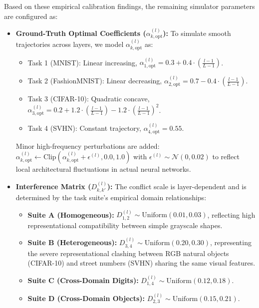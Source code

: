 Based on these empirical calibration findings, the remaining simulator parameters are configured as:
\begin{itemize}
    \item \textbf{Ground-Truth Optimal Coefficients ($\alpha_{k, \text{opt}}^{(l)}$):} To simulate smooth trajectories across layers, we model $\alpha_{k, \text{opt}}^{(l)}$ as:
    \begin{itemize}
        \item Task 1 (MNIST): Linear increasing, $\alpha_{1, \text{opt}}^{(l)} = 0.3 + 0.4 \cdot \left(\frac{l-1}{L-1}\right)$.
        \item Task 2 (FashionMNIST): Linear decreasing, $\alpha_{2, \text{opt}}^{(l)} = 0.7 - 0.4 \cdot \left(\frac{l-1}{L-1}\right)$.
        \item Task 3 (CIFAR-10): Quadratic concave, $\alpha_{3, \text{opt}}^{(l)} = 0.2 + 1.2 \cdot \left(\frac{l-1}{L-1}\right) - 1.2 \cdot \left(\frac{l-1}{L-1}\right)^2$.
        \item Task 4 (SVHN): Constant trajectory, $\alpha_{4, \text{opt}}^{(l)} = 0.55$.
    \end{itemize}
    Minor high-frequency perturbations are added: $\alpha_{k, \text{opt}}^{(l)} \leftarrow \text{Clip}(\alpha_{k, \text{opt}}^{(l)} + \epsilon^{(l)}, 0.0, 1.0)$ with $\epsilon^{(l)} \sim \mathcal{N}(0, 0.02)$ to reflect local architectural fluctuations in actual neural networks.
    \item \textbf{Interference Matrix ($D_{k, k'}^{(l)}$):} The conflict scale is layer-dependent and is determined by the task suite's empirical domain relationships:
    \begin{itemize}
        \item \textbf{Suite A (Homogeneous):} $D_{1, 2}^{(l)} \sim \text{Uniform}(0.01, 0.03)$, reflecting high representational compatibility between simple grayscale shapes.
        \item \textbf{Suite B (Heterogeneous):} $D_{3, 4}^{(l)} \sim \text{Uniform}(0.20, 0.30)$, representing the severe representational clashing between RGB natural objects (CIFAR-10) and street numbers (SVHN) sharing the same visual features.
        \item \textbf{Suite C (Cross-Domain Digits):} $D_{1, 4}^{(l)} \sim \text{Uniform}(0.12, 0.18)$.
        \item \textbf{Suite D (Cross-Domain Objects):} $D_{2, 3}^{(l)} \sim \text{Uniform}(0.15, 0.21)$.
    \end{itemize}
\end{itemize}

